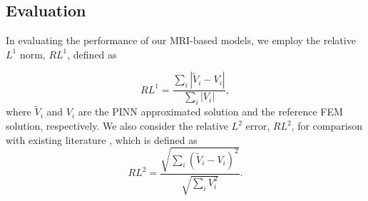 \subsection{Evaluation}
In evaluating the performance of our MRI-based models, we employ the relative $L^1$ norm, $RL^1$, defined as

\begin{equation}
RL^1 = \frac{\sum_{i} |\tilde{V}_i - V_i|}{\sum_{i} |V_i|},
\end{equation}
where $\tilde{V}_i$ and $V_i$ are the PINN approximated solution and the reference FEM solution, respectively. 
We also consider the relative $L^2$ error, $RL^2$, for comparison with existing literature \cite{PDL}, which is defined as
\begin{equation}
RL^2 = \frac{\sqrt{\sum_{i} (\tilde{V}_i - V_i)^2}}{\sqrt{\sum_{i} V_i^2}}.
\end{equation}


